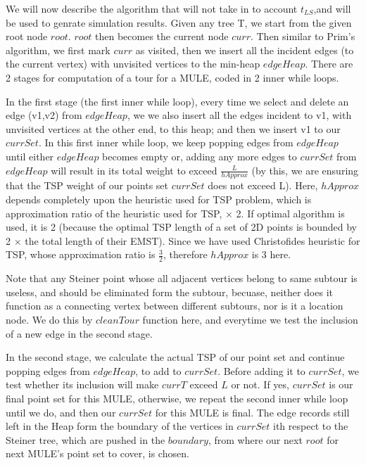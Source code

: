 We will now describe the algorithm that will not take in to account $t_{LS}$,and will be used to genrate simulation results. Given any tree T, we start from the given root node $root$. $root$ then becomes the current node $curr$. Then similar to Prim's algorithm, we first mark $curr$ as visited, then we insert all the incident edges (to the current vertex) with unvisited vertices to the min-heap $edgeHeap$. There are 2 stages for computation of a tour for a MULE, coded in 2 inner while loops.

In the first stage (the first inner while loop), every time we select and delete an edge (v1,v2) from $edgeHeap$, we we also insert all the edges incident to v1, with unvisited vertices at the other end, to this heap; and then we insert v1 to our $currSet$. In this first inner while loop, we keep popping edges from $edgeHeap$ until either $edgeHeap$ becomes empty or, adding any more edges to $currSet$ from $edgeHeap$ will result in its total weight to exceed $\frac{L}{hApprox}$ (by this, we are ensuring that the TSP weight of our points set $currSet$ does not exceed L). Here, $hApprox$ depends completely upon the heuristic used for TSP problem, which is approximation ratio of the heuristic used for TSP, $\times$ 2. If optimal algorithm is used, it is 2 (because the optimal TSP length of  a set of 2D points is bounded by 2 $\times$ the total length of their EMST). Since we have used Christofides heuristic for TSP, whose approximation ratio is $\frac{3}{2}$, therefore $hApprox$ is 3 here.

Note that any Steiner point whose all adjacent vertices belong to same subtour is useless, and should be eliminated form the subtour, becuase, neither does it function as a connecting vertex between different subtours, nor is it a location node. We do this by $cleanTour$ function here, and everytime we test the inclusion of a new edge in the second stage.

In the second stage, we calculate the actual TSP of our point set and continue popping edges from $edgeHeap$, to add to $currSet$. Before adding it to $currSet$, we test whether its inclusion will make $currT$ exceed $L$ or not. If yes, $currSet$ is our final point set for this MULE, otherwise, we repeat the second inner while loop until we do, and then our $currSet$ for this MULE is final. The edge records still left in the Heap form the boundary of the vertices in $currSet$ ith respect to the Steiner tree, which are pushed in the $boundary$, from where our next $root$ for next MULE's point set to cover, is chosen.


